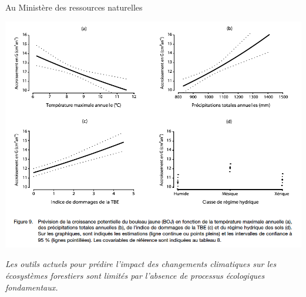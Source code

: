 \documentclass{eecslides}
\begin{document}
	\begin{frame}{Au Ministère des ressources naturelles}
		\begin{center}
			\includegraphics[height=0.65\textheight]{Perie2012.png}
		\end{center}
	\end{frame}


	\begin{frame}

		\textit{Les outils actuels pour prédire l'impact des changements climatiques sur les écosystèmes forestiers sont limités par l'absence de processus écologiques fondamentaux.}

	\end{frame}
							
\end{document}
